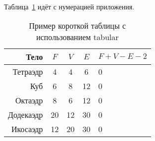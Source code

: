 
Таблица~\ref{tab:b1} идёт с нумерацией приложения.

\begin{table}    
    \caption{Пример короткой таблицы с использованием tabular}
    \begin{tabular}{|r|c|c|c|l|}\hline
    Тело      & $F$ & $V$  & $E$ & $F+V-E-2$ \\ \hline
    Тетраэдр  & 4   & 4    & 6   & 0         \\ \hhline{~-~-~}
    Куб       & 6   & 8    & 12  & 0         \\ \hhline{--~~~}
    Октаэдр   & 8   & 6    & 12  & 0         \\ \hhline{-----}
    Додекаэдр & 20  & 12   & 30  & 0         \\ \hline
    Икосаэдр  & 12  & 20   & 30  & 0         \\ \hline
    \end{tabular}
    \label{tab:b1}
\end{table}

\blindtext[1]
